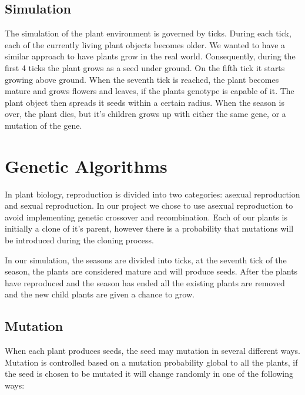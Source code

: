 \documentclass[conference]{acmsiggraph}
\begin{document}
\subsection{Simulation}

The simulation of the plant environment is governed by ticks. During each tick,
each of the currently living plant objects becomes older. We wanted to have a
similar approach to have plants grow in the real world. Consequently, during the
first 4 ticks the plant grows as a seed under ground. On the fifth tick it
starts growing above ground. When the seventh tick is reached, the plant becomes
mature and grows flowers and leaves, if the plants genotype is capable of it.
The plant object then spreads it seeds within a certain radius. When the season
is over, the plant dies, but it's children grows up with either the same gene,
or a mutation of the gene.

\section{Genetic Algorithms}

In plant biology, reproduction is divided into two categories: asexual
reproduction and sexual reproduction. In our project we chose to use asexual
reproduction to avoid implementing genetic crossover and recombination. Each of
our plants is initially a clone of it's parent, however there is a probability
that mutations will be introduced during the cloning process.\cite{plantrepo}

In our simulation, the seasons are divided into ticks, at the seventh tick of
the season, the plants are considered mature and will produce seeds. After the
plants have reproduced and the season has ended all the existing plants are
removed and the new child plants are given a chance to grow.

\subsection{Mutation}

When each plant produces seeds, the seed may mutation in several different
ways. Mutation is controlled based on a mutation probability global to all the
plants, if the seed is chosen to be mutated it will change randomly in one of
the following ways:
\end{document}
